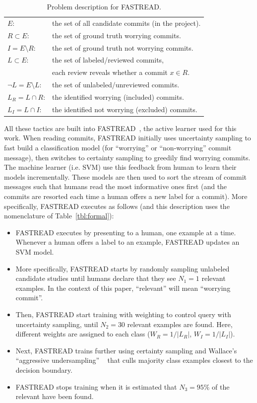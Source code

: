 \documentclass[10pt,journal,compsoc]{IEEEtran}
\newcommand{\bi}{\begin{itemize}[leftmargin=0.4cm]}
\newcommand{\ei}{\end{itemize}}
\newcommand{\tbl}[1]{Table~\ref{tbl:#1}}
\begin{document}
\begin{table}[!b]
\footnotesize
\caption{Problem description for FASTREAD.}\label{tbl:formal} 
\label{tab: problem}
\begin{tabular}{ll}
\rowcolor{gray!10} 
$E$: & the set of all candidate commits (in the project).\\\rowcolor{gray!10} 
$R\subset E$: & the set of ground truth worrying commits. \\\rowcolor{gray!10} 
$I=E\setminus R$: & the set of ground truth not worrying commits.\\\rowcolor{gray!10} 
$L\subset E$: & the set of labeled/reviewed commits, \\\rowcolor{gray!10}  & each review reveals whether a commit $x\in R$.\\\rowcolor{gray!10} 
$\neg L=E\setminus L$: & the set of unlabeled/unreviewed commits.\\\rowcolor{gray!10} 
$L_R=L\cap R$: & the identified worrying (included) commits.\\\rowcolor{gray!10} 
$L_I=L\cap I$: & the identified not worrying (excluded) commits.
\end{tabular} 
\end{table}
 



  All these tactics are built into FASTREAD~\cite{yu18v},
 the active learner used for this work.
 When reading   commits, FASTREAD
 initially uses uncertainty sampling to fast build a classification model (for ``worrying''
 or ``non-worrying'' commit message), then switches to certainty sampling to greedily find worrying commits. The machine learner (i.e. SVM) use this feedback from human to learn their models incrementally. These models are then used to sort the stream of commit messages such that humans read the most informative ones first
 (and the commits are resorted each time a human offers a new label for a commit). More specifically, 
 FASTREAD executes as follows (and this description uses the  nomenclature of \tbl{formal}):
 \bi
 \item
 FASTREAD executes by presenting to a human,  one example at a time. Whenever a human
offers a label to an example, FASTREAD updates an SVM model.
\item
More specifically, FASTREAD starts by
randomly sampling unlabeled candidate studies until humans declare that they see $N_1=1$ relevant examples. In 
the context of this paper,  ``relevant'' will
mean ``worrying commit''.
\item
Then, FASTREAD
start training with weighting to control query with uncertainty sampling, until $N_2=30$ relevant examples are found.
Here, different weights are assigned to each class
($W_R= 1/|L_R|$, $W_I= 1/|L_I|$).
\item
Next, FASTREAD trains  further  using
certainty sampling and 
Wallace's ``aggressive undersampling'' ~\cite{Wallace2010Semi}
that culls   majority class examples closest to the  decision boundary.
\item 
FASTREAD
stops training when it is estimated that \mbox{$N_3=95\%$} of the relevant have
been found.
\ei
\end{document}
